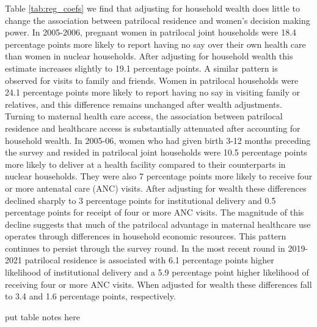 \documentclass[12pt]{article}
\begin{document}
Table \ref{tab:reg_coefs} we find that adjusting for household wealth does little to change the association between patrilocal residence and women’s decision making power. In 2005-2006, pregnant women in patrilocal joint households were 18.4 percentage points more likely to report having no say over their own health care than women in nuclear households. After adjusting for household wealth this estimate increases slightly to 19.1 percentage points. A similar pattern is observed for visits to family and friends. Women in patrilocal households were 24.1 percentage points more likely to report having no say in visiting family or relatives, and this difference remains unchanged after wealth adjustments. 
Turning to maternal health care access, the association between patrilocal residence and healthcare access is substantially attenuated after accounting for household wealth. In 2005-06, women who had given birth 3-12 months preceding the survey and resided in patrilocal joint households were 10.5 percentage points more likely to deliver at a health facility compared to their counterparts in nuclear households. They were also 7 percentage points more likely to receive four or more antenatal care (ANC) visits. 
After adjusting for wealth these differences declined sharply to 3 percentage points for institutional delivery and 0.5 percentage points for receipt of four or more ANC visits. The magnitude of this decline suggests that much of the patrilocal advantage in maternal healthcare use operates through differences in household economic resources. 
This pattern continues to persist through the survey round. In the most recent round in 2019-2021 patrilocal residence is associated with 6.1 percentage points higher likelihood of institutional delivery and a 5.9 percentage point higher likelihood of receiving four or more ANC visits. When adjusted for wealth these differences fall to 3.4 and 1.6 percentage points, respectively.

\newpage

\begin{table}[!htbp]
    \centering
    \begin{threeparttable}[t]
        \caption{:  patrilocal coefficient in different regression specifications}
        \label{tab:reg_coefs}

        \scriptsize
        \setlength{\tabcolsep}{6pt}
        \renewcommand{\arraystretch}{2}

        

        \begin{tablenotes}
            \item put table notes here
        \end{tablenotes}
    \end{threeparttable}
\end{table}
\end{document}

